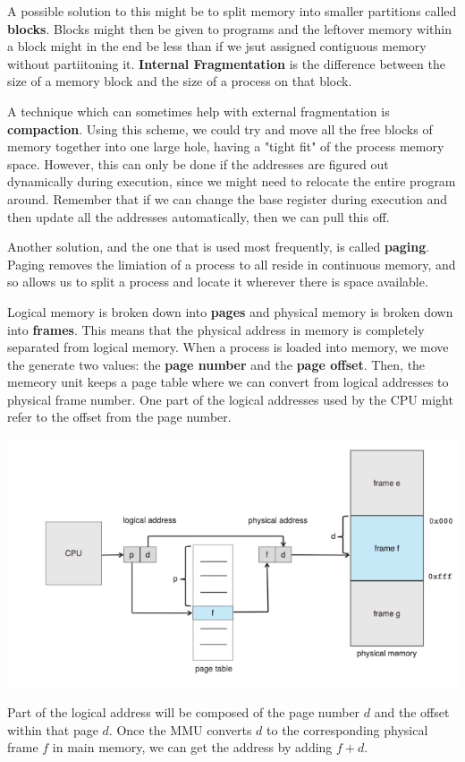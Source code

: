 \documentclass{tufte-handout}
\begin{document}
A possible solution to this might be to split memory into smaller partitions called
\textbf{blocks}. Blocks might then be given to programs and the leftover memory within
a block might in the end be less than if we jsut assigned contiguous memory without
partiitoning it. \textbf{Internal Fragmentation} is the difference between the size
of a memory block and the size of a process on that block. 

A technique which can sometimes help with external fragmentation is \textbf{compaction}.
Using this scheme, we could try and move all the free blocks of memory together into
one large hole, having a "tight fit" of the process memory space. However, this can 
only be done if the addresses are figured out dynamically during execution, since 
we might need to relocate the entire program around. Remember that if we can change 
the base register during execution and then update all the addresses automatically,
then we can pull this off.

Another solution, and the one that is used most frequently, is called \textbf{paging}.
Paging removes the limiation of a process to all reside in continuous memory, and 
so allows us to split a process and locate it wherever there is space available.

Logical memory is broken down into \textbf{pages} and physical memory is broken down into
\textbf{frames}. This means that the physical address in memory is completely separated
from logical memory. When a process is loaded into memory, we move the generate two values:
the \textbf{page number} and the \textbf{page offset}. Then, the memeory unit keeps a 
page table where we can convert from logical addresses to physical frame number.
One part of the logical addresses used by the CPU might refer to the offset from the page
number.

\begin{marginfigure}
	\includegraphics[scale=0.2]{paging.png}
	\caption{Part of the logical address will be composed of the page number $d$ and the offset
		within that page $d$. Once the MMU converts $d$ to the corresponding physical frame $f$
		in main memory, we can get the address by adding $f + d$.}
\end{marginfigure}
\end{document}
